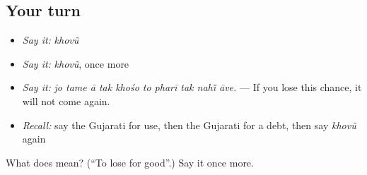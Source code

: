 \subsection*{Your turn}
\begin{itemize}
\raggedright
  \item \emph{Say it:} \emph{khovũ}
  \item \emph{Say it:} \emph{khovũ}, once more
  \item \emph{Say it:} \emph{jo tame ā tak khośo to pharī tak nahī̃ āve.} — If you lose this chance, it will not come again.
  \item \emph{Recall:} say the Gujarati for use, then the Gujarati for a debt, then say \emph{khovũ} again
\end{itemize}

\begin{tcolorbox}[breakable,colback=teal!4,colframe=teal!35!black,title={Before you move on}]
What does  mean? (\textquotedblleft{}To lose for good\textquotedblright{}.) Say it once more.
\end{tcolorbox}
